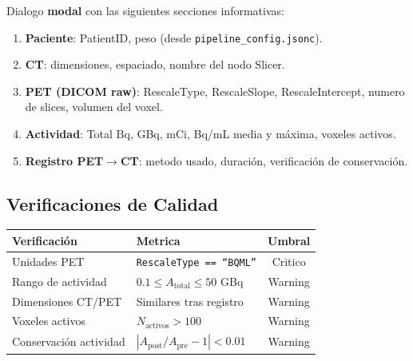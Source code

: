 \documentclass[12pt,a4paper]{article}
\begin{document}
Dialogo \textbf{modal} con las siguientes secciones informativas:

\begin{enumerate}
    \item \textbf{Paciente}: PatientID, peso (desde \texttt{pipeline\_config.jsonc}).
    \item \textbf{CT}: dimensiones, espaciado, nombre del nodo Slicer.
    \item \textbf{PET (DICOM raw)}: RescaleType, RescaleSlope, RescaleIntercept,
          numero de slices, volumen del voxel.
    \item \textbf{Actividad}: Total Bq, GBq, mCi, Bq/mL media y máxima, voxeles activos.
    \item \textbf{Registro PET$\to$CT}: metodo usado, duración, verificación de conservación.
\end{enumerate}

\subsection{Verificaciones de Calidad}

\begin{table}[H]
\centering
\begin{tabular}{llc}
\toprule
\textbf{Verificación} & \textbf{Metrica} & \textbf{Umbral} \\
\midrule
Unidades PET & \texttt{RescaleType == ``BQML''} & Critico \\
Rango de actividad & $0.1 \leq A_{\text{total}} \leq 50$ GBq & Warning \\
Dimensiones CT/PET & Similares tras registro & Warning \\
Voxeles activos & $N_{\text{activos}} > 100$ & Warning \\
Conservación actividad & $|A_{\text{post}}/A_{\text{pre}} - 1| < 0.01$ & Warning \\
\bottomrule
\end{tabular}
\end{table}
\end{document}
